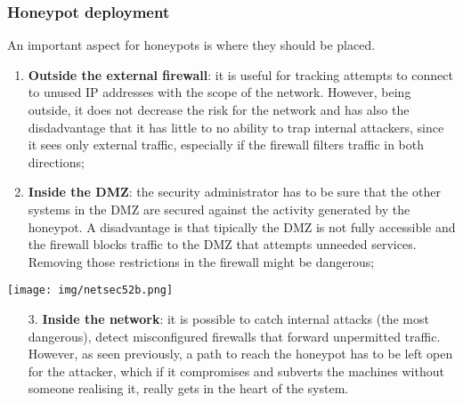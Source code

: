 \documentclass[a4paper, 10pt, titlepage]{article}
\begin{document}
\subsubsection*{Honeypot deployment}
An important aspect for honeypots is where they should be placed.\\
\begin{minipage}{0.45\textwidth}
	\begin{enumerate}
		\item \textbf{Outside the external firewall}: it is useful for tracking attempts to connect to unused IP addresses with the scope of the network. However, being outside, it does not decrease the risk for the network and has also the disdadvantage that it has little to no ability to trap internal attackers, since it sees only external traffic, especially if the firewall filters traffic in both directions;
		\item \textbf{Inside the DMZ}: the security administrator has to be sure that the other systems in the DMZ are secured against the activity generated by the honeypot. A disadvantage is that tipically the DMZ is not fully accessible and the firewall blocks traffic to the DMZ that attempts unneeded services. Removing those restrictions in the firewall might be dangerous;
 	\end{enumerate}
\end{minipage}\hfill
\begin{minipage}{0.52\textwidth}
	\begin{center}
		\texttt{[image: img/netsec52b.png]}
	\end{center}
\end{minipage}
\begin{enumerate}
	\item[3.] \textbf{Inside the network}: it is possible to catch internal attacks (the most dangerous), detect misconfigured firewalls that forward unpermitted traffic. However, as seen previously, a path to reach the honeypot has to be left open for the attacker, which if it compromises and subverts the machines without someone realising it, really gets in the heart of the system.
\end{enumerate}
\end{document}
